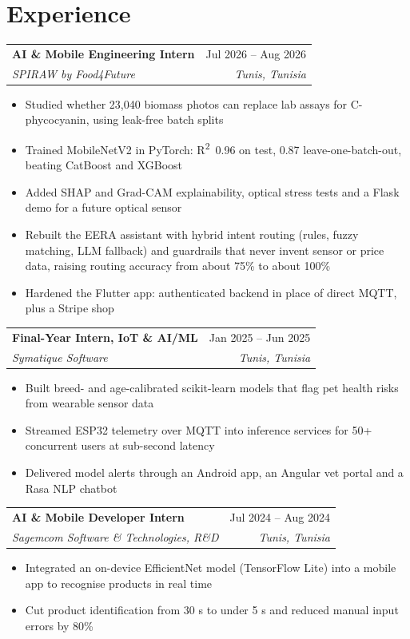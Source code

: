 \documentclass[a4paper,11pt]{article}
\makeatletter
\newcommand{\role}[4]{%
  \begin{tabular*}{\linewidth}{l@{\extracolsep{\fill}}r}
    \textbf{#1} & #2 \\
    \textit{#3} & \textit{#4} \\
  \end{tabular*}\par}
\newenvironment{points}{\begin{itemize}[leftmargin=1.4em,itemsep=1pt,topsep=2pt,parsep=0pt]\small}{\end{itemize}\vspace{4pt}}
\makeatother
\begin{document}
\section{Experience}
\role{AI \& Mobile Engineering Intern}{Jul 2026 -- Aug 2026}{SPIRAW by Food4Future}{Tunis, Tunisia}
\begin{points}
  \item Studied whether 23,040 biomass photos can replace lab assays for C-phycocyanin, using leak-free batch splits
  \item Trained MobileNetV2 in PyTorch: R\textsuperscript{2}~0.96 on test, 0.87 leave-one-batch-out, beating CatBoost and XGBoost
  \item Added SHAP and Grad-CAM explainability, optical stress tests and a Flask demo for a future optical sensor
  \item Rebuilt the EERA assistant with hybrid intent routing (rules, fuzzy matching, LLM fallback) and guardrails that never
        invent sensor or price data, raising routing accuracy from about 75\% to about 100\%
  \item Hardened the Flutter app: authenticated backend in place of direct MQTT, plus a Stripe shop
\end{points}
\role{Final-Year Intern, IoT \& AI/ML}{Jan 2025 -- Jun 2025}{Symatique Software}{Tunis, Tunisia}
\begin{points}
  \item Built breed- and age-calibrated scikit-learn models that flag pet health risks from wearable sensor data
  \item Streamed ESP32 telemetry over MQTT into inference services for 50+ concurrent users at sub-second latency
  \item Delivered model alerts through an Android app, an Angular vet portal and a Rasa NLP chatbot
\end{points}
\role{AI \& Mobile Developer Intern}{Jul 2024 -- Aug 2024}{Sagemcom Software \& Technologies, R\&D}{Tunis, Tunisia}
\begin{points}
  \item Integrated an on-device EfficientNet model (TensorFlow Lite) into a mobile app to recognise products in real time
  \item Cut product identification from 30 s to under 5 s and reduced manual input errors by 80\%
\end{points}
\end{document}
